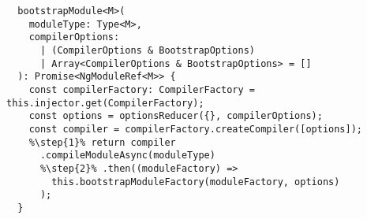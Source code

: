 \begin{verbatim}
  bootstrapModule<M>(
    moduleType: Type<M>,
    compilerOptions:
      | (CompilerOptions & BootstrapOptions)
      | Array<CompilerOptions & BootstrapOptions> = []
  ): Promise<NgModuleRef<M>> {
    const compilerFactory: CompilerFactory = this.injector.get(CompilerFactory);
    const options = optionsReducer({}, compilerOptions);
    const compiler = compilerFactory.createCompiler([options]);
    %\step{1}% return compiler
      .compileModuleAsync(moduleType)
      %\step{2}% .then((moduleFactory) =>
        this.bootstrapModuleFactory(moduleFactory, options)
      );
  }
\end{verbatim}
